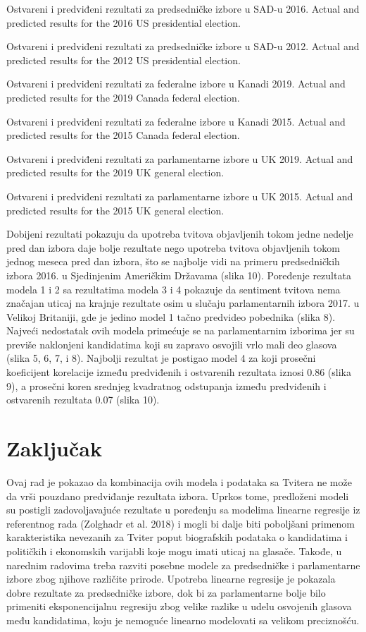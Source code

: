     {Ostvareni i predviđeni rezultati za predsedničke izbore u SAD-u 2016.}
    {Actual and predicted results for the 2016 US presidential election.}

    {Ostvareni i predviđeni rezultati za predsedničke izbore u SAD-u 2012.}
    {Actual and predicted results for the 2012 US presidential election.}

    {Ostvareni i predviđeni rezultati za federalne izbore u Kanadi 2019.}
    {Actual and predicted results for the 2019 Canada federal election.}

    {Ostvareni i predviđeni rezultati za federalne izbore u Kanadi 2015.}
    {Actual and predicted results for the 2015 Canada federal election.}

    {Ostvareni i predviđeni rezultati za parlamentarne izbore u UK 2019.}
    {Actual and predicted results for the 2019 UK general election.}

    {Ostvareni i predviđeni rezultati za parlamentarne izbore u UK 2015.}
    {Actual and predicted results for the 2015 UK general election.}

Dobijeni rezultati pokazuju da upotreba tvitova objavljenih tokom jedne nedelje pred dan izbora daje bolje rezultate nego upotreba tvitova objavljenih tokom jednog meseca pred dan izbora, što se najbolje vidi na primeru predsedničkih izbora 2016. u Sjedinjenim Američkim Državama (slika 10). Poređenje rezultata modela 1 i 2 sa rezultatima modela 3 i 4 pokazuje da sentiment tvitova nema značajan uticaj na krajnje rezultate osim u slučaju parlamentarnih izbora 2017. u Velikoj Britaniji, gde je jedino model 1 tačno predvideo pobednika (slika 8). Najveći nedostatak ovih modela primećuje se na parlamentarnim izborima jer su previše naklonjeni kandidatima koji su zapravo osvojili vrlo mali deo glasova (slika 5, 6, 7, i 8). Najbolji rezultat je postigao model 4 za koji prosečni koeficijent korelacije između predviđenih i ostvarenih rezultata iznosi 0.86 (slika 9), a prosečni koren srednjeg kvadratnog odstupanja između predviđenih i ostvarenih rezultata 0.07 (slika 10). 

\section{Zaključak}

Ovaj rad je pokazao da kombinacija ovih modela i podataka sa Tvitera ne može da vrši pouzdano predviđanje rezultata izbora. Uprkos tome, predloženi modeli su postigli zadovoljavajuće rezultate u poređenju sa modelima linearne regresije iz referentnog rada (Zolghadr et al. 2018) i mogli bi dalje biti poboljšani primenom karakteristika nevezanih za Tviter poput biografskih podataka o kandidatima i političkih i ekonomskih varijabli koje mogu imati uticaj na glasače. Takođe, u narednim radovima treba razviti posebne modele za predsedničke i parlamentarne izbore zbog njihove različite prirode. Upotreba linearne regresije je pokazala dobre rezultate za predsedničke izbore, dok bi za parlamentarne bolje bilo primeniti eksponencijalnu regresiju zbog velike razlike u udelu osvojenih glasova među kandidatima, koju je nemoguće linearno modelovati sa velikom preciznošću.

